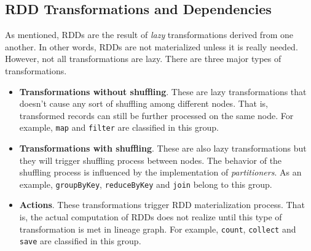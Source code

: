\subsection{RDD Transformations and Dependencies}
\label{sp:depend}

As mentioned, RDDs are the result of \emph{lazy} transformations derived from one another. In other words, RDDs are not materialized unless it is really needed. However, not all transformations are lazy. There are three major types of transformations.
\begin{itemize}
    \item \textbf{Transformations without shuffling}. These are lazy transformations that doesn't cause any sort of shuffling among different nodes. That is, transformed records can still be further processed on the same node. For example, \lstinline$map$ and \lstinline$filter$ are classified in this group.
    \item \textbf{Transformations with shuffling}. These are also lazy transformations but they will trigger shuffling process between nodes. The behavior of the shuffling process is influenced by the implementation of \emph{partitioners}. As an example, \lstinline$groupByKey$, \lstinline$reduceByKey$ and \lstinline$join$ belong to this group.
    \item \textbf{Actions}. These transformations trigger RDD materialization process. That is, the actual computation of RDDs does not realize until this type of transformation is met in lineage graph. For example, \lstinline$count$, \lstinline$collect$ and \lstinline$save$ are classified in this group.
\end{itemize}

